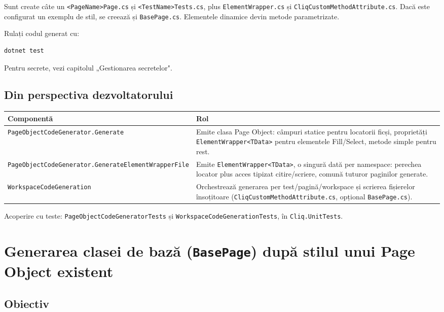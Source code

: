 \documentclass[12pt,a4paper]{report}
\newcommand{\File}[1]{\nolinkurl{#1}}
\begin{document}
Sunt create câte un \File{<PageName>Page.cs} și \File{<TestName>Tests.cs}, plus \File{ElementWrapper.cs} și \File{CliqCustomMethodAttribute.cs}. Dacă este configurat un exemplu de stil, se creează și \File{BasePage.cs}. Elementele dinamice devin metode parametrizate.

Rulați codul generat cu:

\begin{lstlisting}
dotnet test
\end{lstlisting}

Pentru secrete, vezi capitolul „Gestionarea secretelor".

\section{Din perspectiva dezvoltatorului}

\begin{tabularx}{\textwidth}{@{}p{5.3cm}Y@{}}
\toprule \textbf{Componentă} & \textbf{Rol} \\
\midrule
\File{PageObjectCodeGenerator.Generate} & Emite clasa Page Object: câmpuri statice pentru locatorii ficși, proprietăți \File{ElementWrapper<TData>} pentru elementele Fill/Select, metode simple pentru rest. \\
\File{PageObjectCodeGenerator.GenerateElementWrapperFile} & Emite \File{ElementWrapper<TData>}, o singură dată per namespace: perechea locator plus acces tipizat citire/scriere, comună tuturor paginilor generate. \\
\File{WorkspaceCodeGeneration} & Orchestrează generarea per test/pagină/workspace și scrierea fișierelor însoțitoare (\File{CliqCustomMethodAttribute.cs}, opțional \File{BasePage.cs}). \\
\bottomrule
\end{tabularx}

Acoperire cu teste: \File{PageObjectCodeGeneratorTests} și \File{WorkspaceCodeGenerationTests}, în \File{Cliq.UnitTests}.

\chapter[Generarea clasei de bază BasePage]{Generarea clasei de bază (\File{BasePage}) după stilul unui Page Object existent}

\section{Obiectiv}
\end{document}
